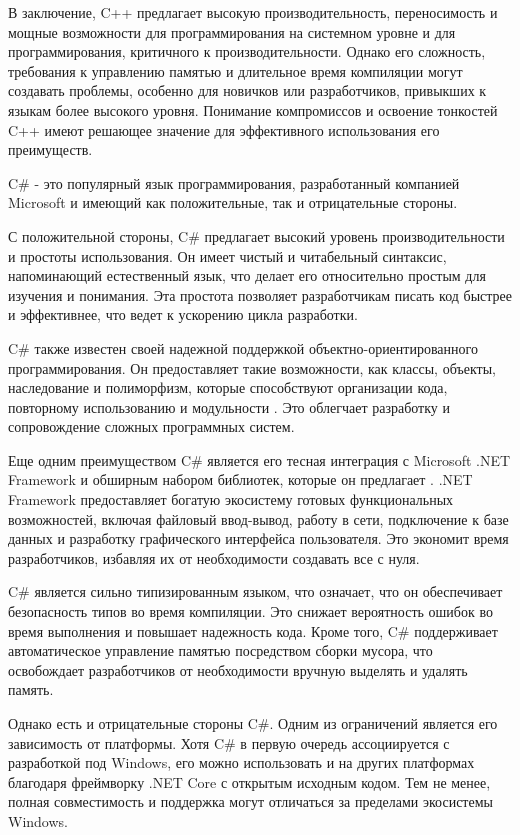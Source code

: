 В заключение, C++ предлагает высокую производительность, переносимость и мощные возможности для программирования на системном уровне и для программирования, критичного к производительности. Однако его сложность, требования к управлению памятью и длительное время компиляции могут создавать проблемы, особенно для новичков или разработчиков, привыкших к языкам более высокого уровня. Понимание компромиссов и освоение тонкостей C++ имеют решающее значение для эффективного использования его преимуществ.

C\# - это популярный язык программирования, разработанный компанией Microsoft и имеющий как положительные, так и отрицательные стороны.

С положительной стороны, C\# предлагает высокий уровень производительности и простоты использования. Он имеет чистый и читабельный синтаксис, напоминающий естественный язык, что делает его относительно простым для изучения и понимания. Эта простота позволяет разработчикам писать код быстрее и эффективнее, что ведет к ускорению цикла разработки.

C\# также известен своей надежной поддержкой объектно-ориентированного программирования. Он предоставляет такие возможности, как классы, объекты, наследование и полиморфизм, которые способствуют организации кода, повторному использованию и модульности \cite{6}. Это облегчает разработку и сопровождение сложных программных систем.

Еще одним преимуществом C\# является его тесная интеграция с Microsoft .NET Framework и обширным набором библиотек, которые он предлагает \cite{7}. .NET Framework предоставляет богатую экосистему готовых функциональных возможностей, включая файловый ввод-вывод, работу в сети, подключение к базе данных и разработку графического интерфейса пользователя. Это экономит время разработчиков, избавляя их от необходимости создавать все с нуля.

C\# является сильно типизированным языком, что означает, что он обеспечивает безопасность типов во время компиляции. Это снижает вероятность ошибок во время выполнения и повышает надежность кода. Кроме того, C\# поддерживает автоматическое управление памятью посредством сборки мусора, что освобождает разработчиков от необходимости вручную выделять и удалять память.

Однако есть и отрицательные стороны C\#. Одним из ограничений является его зависимость от платформы. Хотя C\# в первую очередь ассоциируется с разработкой под Windows, его можно использовать и на других платформах благодаря фреймворку .NET Core с открытым исходным кодом. Тем не менее, полная совместимость и поддержка могут отличаться за пределами экосистемы Windows.

